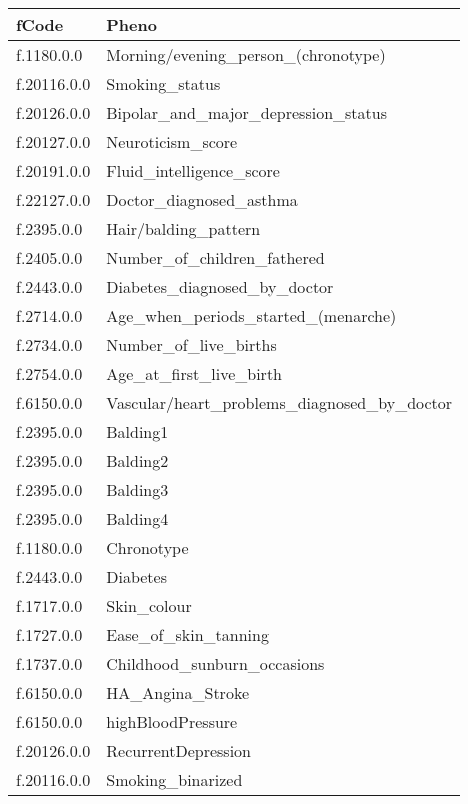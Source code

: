 \begin{longtable}{@{}ll@{}}
\toprule
\textbf{fCode} & \textbf{Pheno}                                  \\* \midrule
\endfirsthead
%
\endhead
%
\bottomrule
\endfoot
%
\endlastfoot
%
f.1180.0.0     & Morning/evening\_person\_(chronotype)           \\
f.20116.0.0    & Smoking\_status                                 \\
f.20126.0.0    & Bipolar\_and\_major\_depression\_status         \\
f.20127.0.0    & Neuroticism\_score                              \\
f.20191.0.0    & Fluid\_intelligence\_score                      \\
f.22127.0.0    & Doctor\_diagnosed\_asthma                       \\
f.2395.0.0     & Hair/balding\_pattern                           \\
f.2405.0.0     & Number\_of\_children\_fathered                  \\
f.2443.0.0     & Diabetes\_diagnosed\_by\_doctor                 \\
f.2714.0.0     & Age\_when\_periods\_started\_(menarche)         \\
f.2734.0.0     & Number\_of\_live\_births                        \\
f.2754.0.0     & Age\_at\_first\_live\_birth                     \\
f.6150.0.0     & Vascular/heart\_problems\_diagnosed\_by\_doctor \\
f.2395.0.0     & Balding1                                        \\
f.2395.0.0     & Balding2                                        \\
f.2395.0.0     & Balding3                                        \\
f.2395.0.0     & Balding4                                        \\
f.1180.0.0     & Chronotype                                      \\
f.2443.0.0     & Diabetes                                        \\
f.1717.0.0     & Skin\_colour                                    \\
f.1727.0.0     & Ease\_of\_skin\_tanning                         \\
f.1737.0.0     & Childhood\_sunburn\_occasions                   \\
f.6150.0.0     & HA\_Angina\_Stroke                              \\
f.6150.0.0     & highBloodPressure                               \\
f.20126.0.0    & RecurrentDepression                             \\
f.20116.0.0    & Smoking\_binarized                              \\* \bottomrule
\end{longtable}\label{table}
